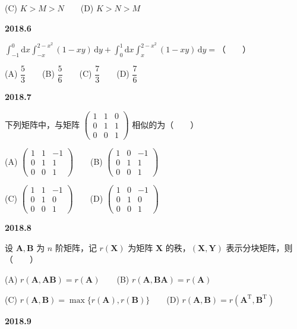 \documentclass[UTF8,12pt,fontset=windows]{ctexart}
\begin{document}
(C) $K > M > N$　　(D) $K > N > M$

\vfill
\newpage
{\large\bfseries 2018.6}

$\int_{-1}^{0}\mathrm{d}x\int_{-x}^{2-x^2}(1-xy)\,\mathrm{d}y + \int_{0}^{1}\mathrm{d}x\int_{x}^{2-x^2}(1-xy)\,\mathrm{d}y =$（　　）

(A) $\dfrac{5}{3}$　　(B) $\dfrac{5}{6}$　　(C) $\dfrac{7}{3}$　　(D) $\dfrac{7}{6}$

\vfill
\newpage
{\large\bfseries 2018.7}

下列矩阵中，与矩阵 $\begin{pmatrix} 1 & 1 & 0 \\ 0 & 1 & 1 \\ 0 & 0 & 1 \end{pmatrix}$ 相似的为（　　）

(A) $\begin{pmatrix} 1 & 1 & -1 \\ 0 & 1 & 1 \\ 0 & 0 & 1 \end{pmatrix}$　　(B) $\begin{pmatrix} 1 & 0 & -1 \\ 0 & 1 & 1 \\ 0 & 0 & 1 \end{pmatrix}$

(C) $\begin{pmatrix} 1 & 1 & -1 \\ 0 & 1 & 0 \\ 0 & 0 & 1 \end{pmatrix}$　　(D) $\begin{pmatrix} 1 & 0 & -1 \\ 0 & 1 & 0 \\ 0 & 0 & 1 \end{pmatrix}$

\vfill
\newpage
{\large\bfseries 2018.8}

设 $\boldsymbol{A}, \boldsymbol{B}$ 为 $n$ 阶矩阵，记 $r(\boldsymbol{X})$ 为矩阵 $\boldsymbol{X}$ 的秩，$(\boldsymbol{X}, \boldsymbol{Y})$ 表示分块矩阵，则（　　）

(A) $r(\boldsymbol{A}, \boldsymbol{AB}) = r(\boldsymbol{A})$　　(B) $r(\boldsymbol{A}, \boldsymbol{BA}) = r(\boldsymbol{A})$

(C) $r(\boldsymbol{A}, \boldsymbol{B}) = \max\{r(\boldsymbol{A}), r(\boldsymbol{B})\}$　　(D) $r(\boldsymbol{A}, \boldsymbol{B}) = r(\boldsymbol{A}^{\mathrm{T}}, \boldsymbol{B}^{\mathrm{T}})$

\vfill
\newpage
{\large\bfseries 2018.9}
\end{document}
